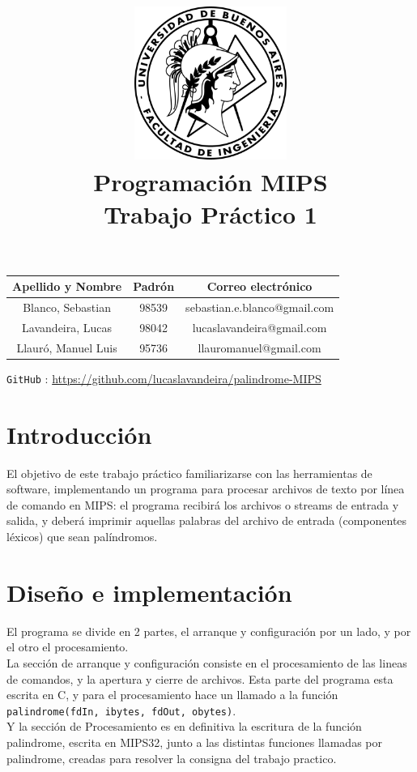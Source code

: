 \documentclass[a4paper,10pt]{article}
\title{
    \includegraphics[width=5cm]{plots/fiuba.png}\\
    Programación MIPS\\
    Trabajo Práctico 1\\}
\date{}
\author{}
\begin{document}
    \maketitle
    \begin{table}[h!]
      \centering
      \begin{tabular}{ccc}
        \toprule
        Apellido y Nombre & Padrón & Correo electrónico \\
        \midrule
        Blanco, Sebastian & 98539 & sebastian.e.blanco@gmail.com\\
        Lavandeira, Lucas & 98042 & lucaslavandeira@gmail.com\\
        Llauró, Manuel Luis & 95736 & llauromanuel@gmail.com\\
        \bottomrule
      \end{tabular}
    \end{table}

    \texttt{GitHub} \faGithub:
    \url{https://github.com/lucaslavandeira/palindrome-MIPS}
      
\newpage
    \tableofcontents

\newpage

    \section{Introducción}
El objetivo de este trabajo práctico familiarizarse con las herramientas de software, implementando un programa para procesar archivos
de texto por línea de comando en MIPS: el programa recibirá los archivos o streams de
entrada y salida, y deberá imprimir aquellas palabras del archivo de entrada
(componentes léxicos) que sean palíndromos.

    \section{Diseño e implementación}
    El programa se divide en 2 partes, el arranque y configuración por un lado, y por el otro el procesamiento.
    \\
    La sección de arranque y configuración consiste en el procesamiento de las lineas de comandos, y la apertura y cierre de archivos. Esta parte del programa esta escrita en C, y para el procesamiento hace un llamado a la función \texttt{palindrome(fdIn, ibytes, fdOut, obytes)}.
    \\
    Y la sección de Procesamiento es en definitiva la escritura de la función palindrome, escrita en MIPS32, junto a las distintas funciones llamadas por palindrome, creadas para resolver la consigna del trabajo practico.
    
\end{document}

